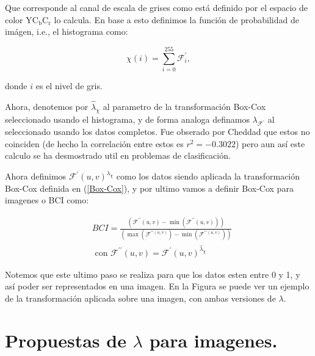     Que corresponde al canal de escala de grises como est\'a definido por el espacio de color $\mathrm{YC}_{\mathrm{b}} \mathrm{C}_{\mathrm{r}}$ lo calcula. En base a esto definimos la funci\'on de probabilidad de im\'agen, i.e., el histograma como:
    
    $$\chi(i)=\sum_{i=0}^{255}\mathcal{F}^{\prime}_i,$$

    donde $i$ es el nivel de gris.
    
    Ahora, denotemos por $\hat{\lambda}_{\chi}$ al parametro de la transformaci\'on Box-Cox seleccionado usando el histograma, y de forma analoga definamos $\lambda_{\mathcal{F}^{\prime}}$ al seleccionado usando los datos completos. Fue obserado por Cheddad que estos no coinciden (de hecho la correlaci\'on entre estos es $r^2=-0.3022$) pero aun as\'i este calculo se ha desmostrado util en problemas de clasificaci\'on.

    Ahora definimos $\mathcal{F}^{\prime}(u, v)^{\lambda_{\chi}}$ como los datos siendo aplicada la transformaci\'on Box-Cox definida en (\ref{Box-Cox}), y por ultimo vamos a definir Box-Cox para imagenes o BCI como:

    $$    
    \begin{aligned}
        &B C I=\frac{\left(\mathcal{F}^{\prime \prime}(u, v)-\min \left(\mathcal{F}^{\prime \prime}(u, v)\right)\right)}{\left(\max \left(\mathcal{F}^{\prime \prime(u, v)}\right)-\min \left(\mathcal{F}^{\prime \prime(u, v)}\right)\right)}\\
        &\text { con } \mathcal{F}^{\prime \prime}(u, v)=\mathcal{F}^{\prime}(u, v)^{\hat{\lambda}_{\chi}}
    \end{aligned}
    $$
    
    Notemos que este ultimo paso se realiza para que los datos esten entre 0 y 1, y as\'i poder ser representados en una imagen. En la Figura se puede ver un ejemplo de la transformaci\'on aplicada sobre una imagen, con ambas versiones de $\lambda$.

    \section[prpuestas de lambda]{Propuestas de $\lambda$ para imagenes.}

    